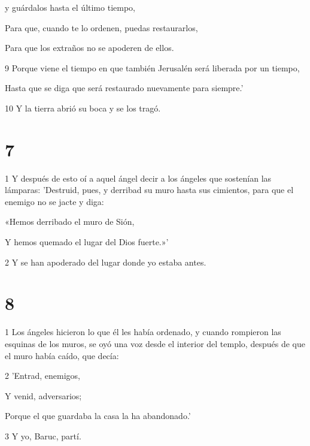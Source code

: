 \par y guárdalos hasta el último tiempo,

\par Para que, cuando te lo ordenen, puedas restaurarlos,

\par Para que los extraños no se apoderen de ellos.

\par 9 Porque viene el tiempo en que también Jerusalén será liberada por un tiempo,

\par Hasta que se diga que será restaurado nuevamente para siempre.'

\par 10 Y la tierra abrió su boca y se los tragó.

\chapter{7}

\par 1 Y después de esto oí a aquel ángel decir a los ángeles que sostenían las lámparas: 'Destruid, pues, y derribad su muro hasta sus cimientos, para que el enemigo no se jacte y diga:

\par «Hemos derribado el muro de Sión,

\par Y hemos quemado el lugar del Dios fuerte.»'

\par 2 Y se han apoderado del lugar donde yo estaba antes.

\chapter{8}

\par 1 Los ángeles hicieron lo que él les había ordenado, y cuando rompieron las esquinas de los muros, se oyó una voz desde el interior del templo, después de que el muro había caído, que decía:

\par 2 'Entrad, enemigos,

Y venid, adversarios;

\par Porque el que guardaba la casa la ha abandonado.'

\par 3 Y yo, Baruc, partí.

